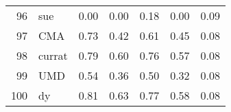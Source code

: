 \documentclass[12pt]{article}
\begin{document}
\begin{footnotesize}
\begin{longtable}{rl|c|c|c|c|c}
				96                   & sue                         & 0.00                             & 0.00                                                                                          & 0.18                                                                                          & 0.00                                                                                          & 0.09                                                                                                   \\
				97                   & CMA                         & 0.73                             & 0.42                                                                                          & 0.61                                                                                          & 0.45                                                                                          & 0.08                                                                                                   \\
				98                   & currat                      & 0.79                             & 0.60                                                                                          & 0.76                                                                                          & 0.57                                                                                          & 0.08                                                                                                   \\
				99                   & UMD                         & 0.54                             & 0.36                                                                                          & 0.50                                                                                          & 0.32                                                                                          & 0.08                                                                                                   \\
				100                  & dy                          & 0.81                             & 0.63                                                                                          & 0.77                                                                                          & 0.58                                                                                          & 0.08                                                                                                   \\

\end{longtable}
\end{footnotesize}
\end{document}

